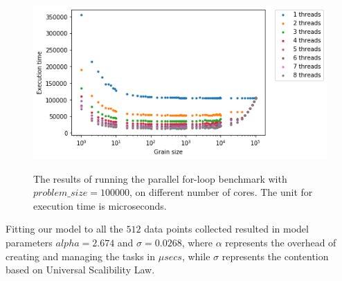  
\begin{figure}[H]
	\centering
	{\includegraphics[scale=.7]{images/hpx_for_loop/marvin_100000_all.png}}
	\caption{The results of running the parallel for-loop benchmark with $problem\_size=100000$, on different number of cores. The unit for execution time is microseconds.}\label{fig42}		
\end{figure}
\vspace{\baselineskip}

Fitting our model to all the $512$ data points collected resulted in model parameters $alpha=2.674$ and $\sigma=0.0268$, where $\alpha$ represents the overhead of creating and managing the tasks in $\mu{secs}$, while $\sigma$ represents the contention based on Universal Scalibility Law.

